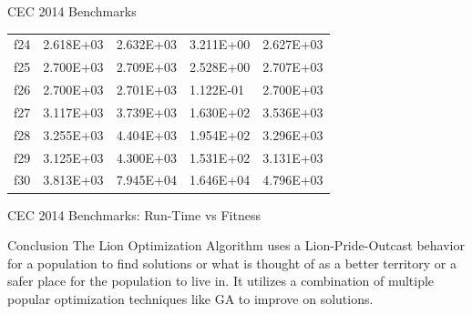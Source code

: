 \documentclass[xcolor=table]{beamer}
\begin{document}
\begin{frame}{CEC 2014 Benchmarks}
\begin{table}[]
{\begin{tabular}{lllll}
f24 & \cellcolor[HTML]{67FD9A}2.618E+03 & \cellcolor[HTML]{67FD9A}2.632E+03 & \cellcolor[HTML]{67FD9A}3.211E+00 & \cellcolor[HTML]{67FD9A}2.627E+03 \\
f25 & \cellcolor[HTML]{67FD9A}2.700E+03 & \cellcolor[HTML]{67FD9A}2.709E+03 & \cellcolor[HTML]{67FD9A}2.528E+00 & \cellcolor[HTML]{67FD9A}2.707E+03 \\
f26 & \cellcolor[HTML]{67FD9A}2.700E+03 & \cellcolor[HTML]{67FD9A}2.701E+03 & \cellcolor[HTML]{67FD9A}1.122E-01 & \cellcolor[HTML]{67FD9A}2.700E+03 \\
f27 & \cellcolor[HTML]{67FD9A}3.117E+03 & \cellcolor[HTML]{67FD9A}3.739E+03 & \cellcolor[HTML]{67FD9A}1.630E+02 & \cellcolor[HTML]{67FD9A}3.536E+03 \\
f28 & \cellcolor[HTML]{67FD9A}3.255E+03 & \cellcolor[HTML]{67FD9A}4.404E+03 & \cellcolor[HTML]{67FD9A}1.954E+02 & \cellcolor[HTML]{67FD9A}3.296E+03 \\
f29 & \cellcolor[HTML]{67FD9A}3.125E+03 & \cellcolor[HTML]{67FD9A}4.300E+03 & \cellcolor[HTML]{67FD9A}1.531E+02 & \cellcolor[HTML]{67FD9A}3.131E+03 \\
f30 & \cellcolor[HTML]{67FD9A}3.813E+03 & \cellcolor[HTML]{67FD9A}7.945E+04 & \cellcolor[HTML]{67FD9A}1.646E+04 & \cellcolor[HTML]{67FD9A}4.796E+03
\end{tabular}}
\end{table}
\end{frame}

\begin{frame}{CEC 2014 Benchmarks: Run-Time vs Fitness}
\end{frame}

\begin{frame}{Conclusion}
The Lion Optimization Algorithm uses a Lion-Pride-Outcast behavior for a population to find solutions or what is thought of as a better territory or a safer place for the population to live in. It utilizes a combination of multiple popular optimization techniques like GA to improve on solutions.
\end{frame}
\end{document}
